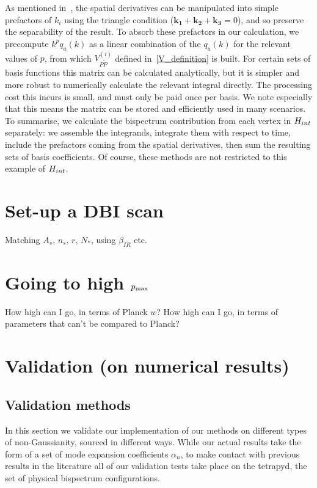 As mentioned in~\cite{Funakoshi}, the spatial derivatives
can be manipulated into simple prefactors of $k_i$ using the
triangle condition ($\mathbf{k_1}+\mathbf{k_2}+\mathbf{k_3}=0$),
and so preserve the separability of the result.
To absorb these prefactors in our calculation, we precompute
$k^{p}q_a(k)$ as a linear combination of the $q_a(k)$ for the
relevant values of $p$,
from which $V^{(i)}_{P\tilde{P}}$ defined in~\eqref{V_definition} is built.
For certain sets of basis functions this matrix can be calculated analytically,
but it is simpler and more robust to numerically calculate the relevant integral directly.
The processing cost this incurs is small, and must only be
paid once per basis. We note especially that this means the matrix can
be stored and efficiently used in many scenarios.
To summarise,
we calculate the bispectrum contribution from each vertex in $H_{int}$ separately:
we assemble the integrands, integrate them with respect to time,
include the prefactors coming from the spatial derivatives,
then sum the resulting sets of basis coefficients.
Of course, these methods are not restricted to this example of $H_{int}$.
\newpage
\section{Set-up a DBI scan}
    Matching $A_s$, $n_s$, $r$, $N_*$, using $\beta_{IR}$ etc.
\newpage
\section{Going to high $p_\text{max}$}
    How high can I go, in terms of Planck $w$?
    How high can I go, in terms of parameters that can't be compared to Planck?

\section{Validation (on numerical results)}\label{sec:validation}
\subsection{Validation methods}\label{sec:validation_methods}
In this section we validate our implementation of our methods
on different types of non-Gaussianity, sourced in different ways.
While our actual results take the form of a set of mode expansion coefficients $\alpha_n$,
to make contact with previous results in the literature
all of our validation tests take place on the tetrapyd,
the set of physical bispectrum configurations.


